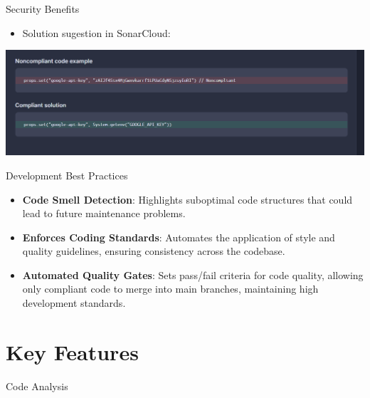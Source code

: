 \documentclass{beamer}
\begin{document}
\begin{frame}{Security Benefits}
  \begin{itemize}
    \item Solution sugestion in SonarCloud: 
  \end{itemize}
  \vspace*{2em}
  \includegraphics[width=1.04\textwidth]{fig/api-security-2.PNG}
\end{frame}

\begin{frame}{Development Best Practices}
  \begin{itemize}
    \item \textbf{Code Smell Detection}: Highlights suboptimal code structures that could lead to future maintenance problems.
    \item \textbf{Enforces Coding Standards}: Automates the application of style and quality guidelines, ensuring consistency across the codebase.
    \item \textbf{Automated Quality Gates}: Sets pass/fail criteria for code quality, allowing only compliant code to merge into main branches, maintaining high development standards.
  \end{itemize}
\end{frame}


\section[Key Features]{Key Features}

\begin{frame}{Code Analysis}
\end{frame}
\end{document}
